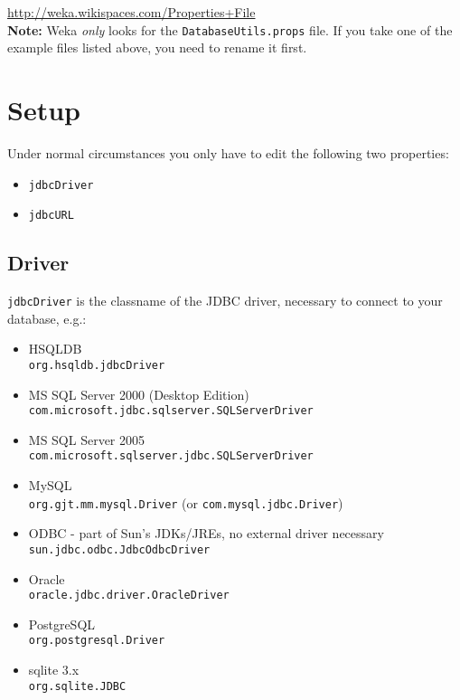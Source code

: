 \url{http://weka.wikispaces.com/Properties+File}{} \\

\noindent \textbf{Note:} Weka \textit{only} looks for the \texttt{DatabaseUtils.props} file. If you take one of the example files listed above, you need to rename it first.


\section{Setup}
Under normal circumstances you only have to edit the following two properties:

\begin{itemize}
	\item \texttt{jdbcDriver}
	\item \texttt{jdbcURL}
\end{itemize}

\subsection*{Driver}
\texttt{jdbcDriver} is the classname of the JDBC driver, necessary to connect to your database, e.g.:

\begin{itemize}
	\item HSQLDB \\
	\texttt{org.hsqldb.jdbcDriver}
	\item MS SQL Server 2000 (Desktop Edition) \\
	\texttt{com.microsoft.jdbc.sqlserver.SQLServerDriver}
	\item MS SQL Server 2005 \\
	\texttt{com.microsoft.sqlserver.jdbc.SQLServerDriver}
	\item MySQL \\
	\texttt{org.gjt.mm.mysql.Driver} (or \texttt{com.mysql.jdbc.Driver})
	\item ODBC - part of Sun's JDKs/JREs, no external driver necessary \\
	\texttt{sun.jdbc.odbc.JdbcOdbcDriver}
	\item Oracle \\
	\texttt{oracle.jdbc.driver.OracleDriver}
	\item PostgreSQL \\
	\texttt{org.postgresql.Driver}
	\item sqlite 3.x \\
	\texttt{org.sqlite.JDBC}
\end{itemize}

